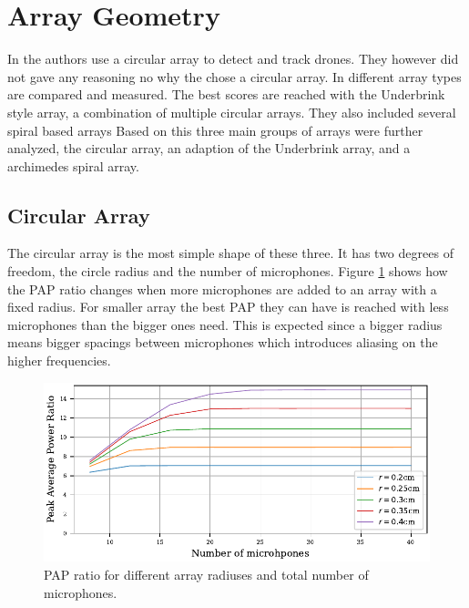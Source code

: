 \section{Array Geometry}
In \cite{GuiAhmad} the authors use a circular array to detect and track drones.
They however did not gave any reasoning no why the chose a circular array.
In \cite{array_comp} different array types are compared and measured.
The best scores are reached with the Underbrink style array, a combination
of multiple circular arrays.
They also included several spiral based arrays
Based on this three main groups of arrays were further analyzed,
the circular array, an adaption of the Underbrink array, and a archimedes
spiral array.
\subsection{Circular Array}
The circular array is the most simple shape of these three.
It has two degrees of freedom, the circle radius and the number of microphones.
Figure \ref*{aev:fig:MicCirc} shows how the PAP ratio changes when
more microphones are added to an array with a fixed radius.
For smaller array the best PAP they can have is reached with less
microphones than the bigger ones need.
This is expected since a bigger radius means bigger spacings between microphones
which introduces aliasing on the higher frequencies.
\begin{figure}[h]
	\centering
	\includegraphics[]{images/5_array_evaluation/circ_m_pap.pdf}
	\caption{PAP ratio for different array radiuses and total number
		of microphones.}
	\label{aev:fig:MicCirc}
\end{figure}

